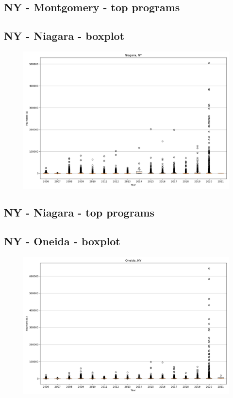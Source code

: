\subsection*{NY - Montgomery - top programs}

\newpage
\subsection*{NY - Niagara - boxplot}
\begin{figure}[h]
\centering
\includegraphics[width=7in]{../output/boxplots/counties/Niagara-NY_boxplot.png}
\end{figure}


\subsection*{NY - Niagara - top programs}

\newpage
\subsection*{NY - Oneida - boxplot}
\begin{figure}[h]
\centering
\includegraphics[width=7in]{../output/boxplots/counties/Oneida-NY_boxplot.png}
\end{figure}


